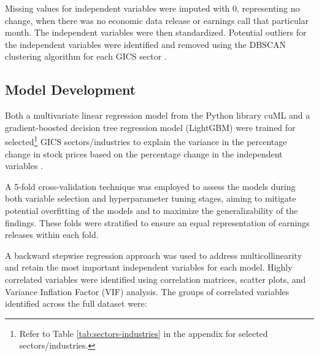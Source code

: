 \documentclass[12pt,a4paper,english]{article}
\begin{document}
Missing values for independent variables were imputed with 0, representing no change, when there was no economic data release or earnings call that particular month. The independent variables were then standardized. Potential outliers for the independent variables were identified and removed using the DBSCAN clustering algorithm for each GICS sector \cite{ester1996density}.

\subsection{Model Development}

Both a multivariate linear regression model from the Python library cuML and a gradient-boosted decision tree regression model (LightGBM) were trained for selected\footnote{Refer to Table \ref{tab:sectors-industries} in the appendix for selected sectors/industries.} GICS sectors/industries to explain the variance in the percentage change in stock prices based on the percentage change in the independent variables \cite{raschka2020machine,zhang2017gpu}.

A 5-fold cross-validation technique was employed to assess the models during both variable selection and hyperparameter tuning stages, aiming to mitigate potential overfitting of the models and to maximize the generalizability of the findings. These folds were stratified to ensure an equal representation of earnings releases within each fold.

A backward stepwise regression approach was used to address multicollinearity and retain the most important independent variables for each model. Highly correlated variables were identified using correlation matrices, scatter plots, and Variance Inflation Factor (VIF) analysis. The groups of correlated variables identified across the full dataset were:
\end{document}
